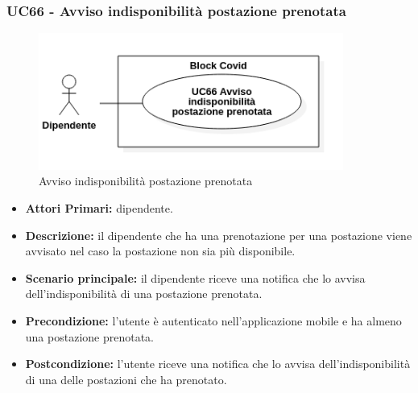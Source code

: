 \subsubsection{ UC66 - Avviso indisponibilità postazione prenotata }
\begin{figure}[H]
		\centering
		\includegraphics[width=10cm]{res/images/UC66.png}
		\caption{Avviso indisponibilità postazione prenotata}
		\label{fig:Avviso indisponibilità postazione prenotata}
	\end{figure}
\begin{itemize}
	\item\textbf{Attori Primari:} dipendente.
	\item\textbf{Descrizione:} il dipendente che ha una prenotazione per una postazione viene avvisato nel caso la postazione non sia più disponibile.
	\item\textbf{Scenario principale:} il dipendente riceve una notifica che lo avvisa dell'indisponibilità di una postazione prenotata.
	\item\textbf{Precondizione:} l’utente è autenticato nell'applicazione mobile e ha almeno una postazione prenotata.
	\item\textbf{Postcondizione:} l'utente riceve una notifica che lo avvisa dell'indisponibilità di una delle postazioni che ha prenotato.
\end{itemize}

